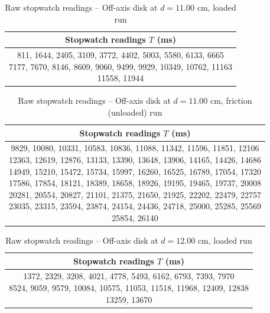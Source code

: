 \begin{table}[htb!]
\centering
\caption{Raw stopwatch readings -- Off-axis disk at $d = 11.00$ cm, loaded run}
\begin{tabular}{c}
\toprule
Stopwatch readings $T$ (\unit{\ms}) \\
\midrule
\makecell{811, 1644, 2405, 3109, 3772, 4402, 5003, 5580, 6133, 6665 \\ 7177, 7670, 8146, 8609, 9060, 9499, 9929, 10349, 10762, 11163 \\ 11558, 11944} \\
\bottomrule
\end{tabular}
\end{table}
\begin{table}[htb!]
\centering
\caption{Raw stopwatch readings -- Off-axis disk at $d = 11.00$ cm, friction (unloaded) run}
\begin{tabular}{c}
\toprule
Stopwatch readings $T$ (\unit{\ms}) \\
\midrule
\makecell{9829, 10080, 10331, 10583, 10836, 11088, 11342, 11596, 11851, 12106 \\ 12363, 12619, 12876, 13133, 13390, 13648, 13906, 14165, 14426, 14686 \\ 14949, 15210, 15472, 15734, 15997, 16260, 16525, 16789, 17054, 17320 \\ 17586, 17854, 18121, 18389, 18658, 18926, 19195, 19465, 19737, 20008 \\ 20281, 20554, 20827, 21101, 21375, 21650, 21925, 22202, 22479, 22757 \\ 23035, 23315, 23594, 23874, 24154, 24436, 24718, 25000, 25285, 25569 \\ 25854, 26140} \\
\bottomrule
\end{tabular}
\end{table}
\begin{table}[htb!]
\centering
\caption{Raw stopwatch readings -- Off-axis disk at $d = 12.00$ cm, loaded run}
\begin{tabular}{c}
\toprule
Stopwatch readings $T$ (\unit{\ms}) \\
\midrule
\makecell{1372, 2329, 3208, 4021, 4778, 5493, 6162, 6793, 7393, 7970 \\ 8524, 9059, 9579, 10084, 10575, 11053, 11518, 11968, 12409, 12838 \\ 13259, 13670} \\
\bottomrule
\end{tabular}
\end{table}

